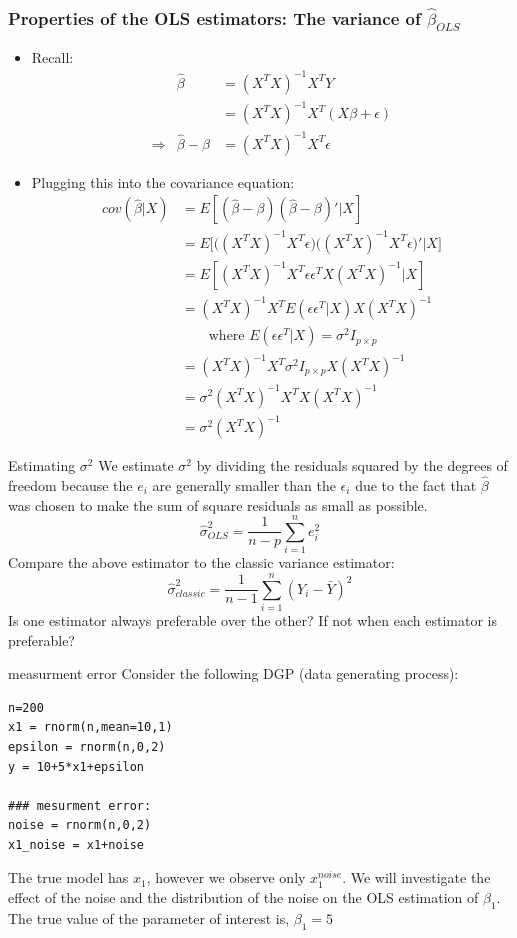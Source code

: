 \documentclass[handout]{beamer}
\begin{document}
\begin{frame}[t]\frametitle{Properties of the OLS estimators: The variance of $\hat{\beta}_{OLS}$}
	\begin{itemize}
		\item Recall:				
			\[ \begin{array}{rrl} & \hat{\beta} &= (X^{T}X)^{-1}X^{T}Y \nonumber \\
			& &= (X^{T}X)^{-1}X^{T}(X\beta + \epsilon) \\
			\Rightarrow & \hat{\beta} - \beta &= (X^{T}X)^{-1}X^{T} \epsilon
			\end{array} \]
			\item Plugging this into the covariance equation:
			\[ \begin{array}{rl}
			cov(\hat{\beta} | X) &= E[(\hat{\beta} - \beta)(\hat{\beta} - \beta)'|X] \\
			 &= E\big[ \big((X^{T}X)^{-1}X^{T}\epsilon \big) \big((X^{T}X)^{-1}X^{T}\epsilon)' | X\big] \\
			 &= E[ (X^{T}X)^{-1}X^{T} \epsilon \epsilon^{T}X(X^{T}X)^{-1} | X] \\
			 &= (X^{T}X)^{-1}X^{T} E(\epsilon\epsilon^{T} | X) X(X^{T}X)^{-1}  \\
			 &\qquad \text{where } E(\epsilon\epsilon^{T} | X) = \sigma^{2} I_{p \times p} \\
			 &= (X^{T}X)^{-1}X^{T} \sigma^{2} I_{p \times p} X(X^{T}X)^{-1} \\
			&= \sigma^{2} (X^{T}X)^{-1}X^{T}X(X^{T}X)^{-1} \\
			&= \sigma^{2} (X^{T}X)^{-1}
			\end{array} \]
	\end{itemize}
	\end{frame}

\begin{frame}{Estimating $\sigma^2$}
We estimate $\sigma^2$ by dividing the residuals squared by the degrees of freedom because the $e_{i}$ are generally smaller than the $\epsilon_{i}$ due to the fact that $\hat{\beta}$ was chosen to make the sum of square residuals as small as possible.
		$$ \hat{\sigma}_{OLS}^2 = \frac{1}{n-p}\sum_{i = 1}^{n} e_{i}^2 $$ 
\pause
Compare the above estimator to the classic variance estimator: 
$$ \hat{\sigma}_{classic}^2 = \frac{1}{n-1}\sum_{i = 1}^{n} \left( Y_i -\bar{Y} \right)^2 $$
\pause
Is one estimator always preferable over the other? If not when each estimator is preferable?
\end{frame}


\begin{frame}[fragile]{measurment error}
Consider the following DGP (data generating process):
\begin{verbatim}
n=200
x1 = rnorm(n,mean=10,1)
epsilon = rnorm(n,0,2)
y = 10+5*x1+epsilon

### mesurment error:
noise = rnorm(n,0,2)
x1_noise = x1+noise
\end{verbatim}
The true model has $x_1$, however we observe only $x_1^{noise}$. We will investigate the effect of the noise and the distribution of the noise on the OLS estimation of $\beta_1$. The true value of the parameter of interest is, $\beta_1 = 5$ 
\end{frame}
\end{document}
